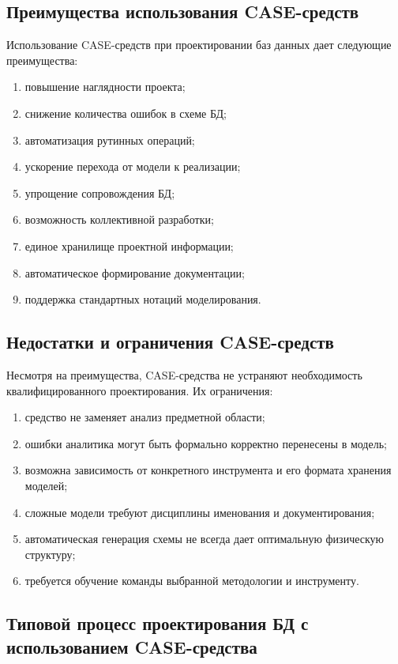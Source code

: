 \documentclass[12pt,a4paper]{article}
\theoremstyle{remark}
\begin{document}
\subsection{Преимущества использования CASE-средств}

Использование CASE-средств при проектировании баз данных дает следующие преимущества:

\begin{enumerate}
    \item повышение наглядности проекта;
    \item снижение количества ошибок в схеме БД;
    \item автоматизация рутинных операций;
    \item ускорение перехода от модели к реализации;
    \item упрощение сопровождения БД;
    \item возможность коллективной разработки;
    \item единое хранилище проектной информации;
    \item автоматическое формирование документации;
    \item поддержка стандартных нотаций моделирования.
\end{enumerate}

\subsection{Недостатки и ограничения CASE-средств}

Несмотря на преимущества, CASE-средства не устраняют необходимость квалифицированного проектирования. Их ограничения:

\begin{enumerate}
    \item средство не заменяет анализ предметной области;
    \item ошибки аналитика могут быть формально корректно перенесены в модель;
    \item возможна зависимость от конкретного инструмента и его формата хранения моделей;
    \item сложные модели требуют дисциплины именования и документирования;
    \item автоматическая генерация схемы не всегда дает оптимальную физическую структуру;
    \item требуется обучение команды выбранной методологии и инструменту.
\end{enumerate}

\subsection{Типовой процесс проектирования БД с использованием CASE-средства}
\end{document}
